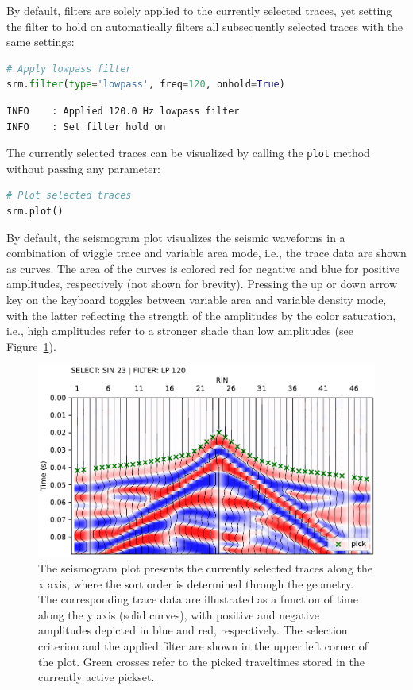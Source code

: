 \documentclass[a4paper,fleqn]{cas-sc}
\begin{document}
By default, filters are solely applied to the currently selected traces, yet setting the filter to hold on automatically filters all subsequently selected traces with the same settings:
\begin{lstlisting}[language=Python, firstnumber=16]
# Apply lowpass filter
srm.filter(type='lowpass', freq=120, onhold=True)
\end{lstlisting}
\begin{footnotesize}
\begin{verbatim}
INFO    : Applied 120.0 Hz lowpass filter
INFO    : Set filter hold on
\end{verbatim}
\end{footnotesize}

The currently selected traces can be visualized by calling the \texttt{plot} method without passing any parameter:
\begin{lstlisting}[language=Python, firstnumber=18]
# Plot selected traces
srm.plot()
\end{lstlisting}
By default, the seismogram plot visualizes the seismic waveforms in a combination of wiggle trace and variable area mode, i.e., the trace data are shown as curves. The area of the curves is colored red for negative and blue for positive amplitudes, respectively (not shown for brevity). Pressing the up or down arrow key on the keyboard toggles between variable area and variable density mode, with the latter reflecting the strength of the amplitudes by the color saturation, i.e., high amplitudes refer to a stronger shade than low amplitudes (see Figure~\ref{fig:srm_intro}).
\begin{figure}
	\centering
	\includegraphics[width=.75\textwidth]{figures/srm_intro.pdf}
	\caption{The seismogram plot presents the currently selected traces along the x axis, where the sort order is determined through the geometry. The corresponding trace data are illustrated as a function of time along the y axis (solid curves), with positive and negative amplitudes depicted in blue and red, respectively. The selection criterion and the applied filter are shown in the upper left corner of the plot. Green crosses refer to the picked traveltimes stored in the currently active pickset.}
	\label{fig:srm_intro}
\end{figure}
\end{document}
